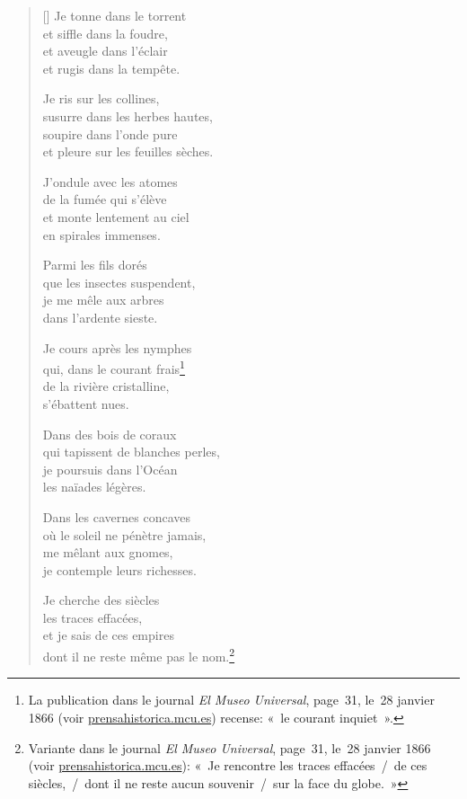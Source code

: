 \documentclass[a4paper,12pt]{book}
\begin{document}
\begin{verse}[\versewidth]
  Je tonne dans le torrent \\
  et siffle dans la foudre, \\
  et aveugle dans l'éclair \\
  et rugis dans la tempête.

  Je ris sur les collines, \\
  susurre dans les herbes hautes, \\
  soupire dans l'onde pure \\
  et pleure sur les feuilles sèches.

  J'ondule avec les atomes \\
  de la fumée qui s'élève \\
  et monte lentement au ciel \\
  en spirales immenses.

  Parmi les fils dorés \\
  que les insectes suspendent, \\
  je me mêle aux arbres \\
  dans l'ardente sieste.

  Je cours après les nymphes \\
  qui, dans le courant frais\footnote{La publication dans
le journal \emph{El Museo Universal}, page~31, le~28 janvier 1866
(voir \url{prensahistorica.mcu.es}) recense: «~le courant inquiet~».} \\
  de la rivière cristalline, \\
  s'ébattent nues.

  Dans des bois de coraux \\
  qui tapissent de blanches perles, \\
  je poursuis dans l'Océan \\
  les naïades légères.

  Dans les cavernes concaves \\
  où le soleil ne pénètre jamais, \\
  me mêlant aux gnomes, \\
  je contemple leurs richesses.

  Je cherche des siècles \\
  les traces effacées, \\
  et je sais de ces empires \\
  dont il ne reste même pas le nom.\footnote{Variante dans le journal
  \emph{El Museo Universal}, page~31, le~28 janvier 1866 (voir
  \url{prensahistorica.mcu.es}): «~Je rencontre les traces effacées~/~de ces siècles,~/~dont il ne reste aucun souvenir~/~sur la face du globe.~»}


\end{verse}
\end{document}
